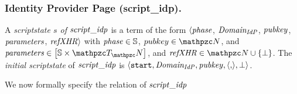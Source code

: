 \begin{algorithmic}[1]
    \ENDIF
  \ENDCASE
      \ENDIF
    \ENDIF
  \ENDCASE
  \ENDSWITCH\\
  \end{algorithmic}\setlength{\parindent}{1em}
  
  \subsubsection{Identity Provider Page (script\_idp).}\label{app:uppresso-script-Idp}
  
  \begin{definition}\label{def:scriptstateidp}
    A \emph{scriptstate $s$ of $\mathit{script\_idp}$} is a term of the form
    $\langle \mathit{phase}$, $\mathit{Domain_{IdP}}$, $\mathit{pubkey}$,  $\mathit{parameters}$, $\mathit{refXHR} \rangle$ with $\mathit{phase} \in
    \mathbb{S}$, $pubkey \in \nonces$, and $\mi{parameters} \in \dict{\mathbb{S}}{\terms}$, and $\mi{refXHR}\in \nonces \cup \{\bot\}$. The 
    \emph{initial scriptstate} of $\mathit{script\_idp}$ is $\langle\mathtt{start},\mathit{Domain_{IdP}}, \mathit{pubkey}, \langle {{},} \rangle, \bot\rangle$.
  \end{definition}
  
  We now formally specify the relation of $\mathit{script\_idp}$
  
